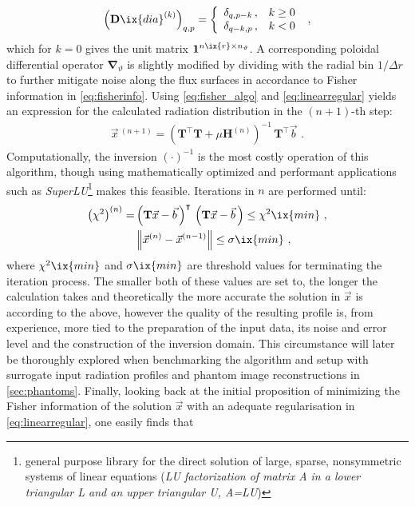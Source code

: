 %
        \begin{align}%
            \left(\mathbf{D}\ix{dia}^{\left(k\right)}\right)_{q,p}=\left\{%
            \begin{array}{ll}%
                \delta_{q,p-k}\,,&k\ge0\\%
                \delta_{q-k,p}\,,&k<0%
            \end{array}\right.\,\,,\nonumber%
        \end{align}%
%
        which for $k=0$ gives the unit matrix $\mathbf{1}^{n\ix{r}\times n_{\text{$\vartheta$}}}$. A corresponding poloidal differential operator $\pmb{\nabla}_{\vartheta}$ is slightly modified by dividing with the radial bin $1/\Delta r$ to further mitigate noise along the flux surfaces in accordance to Fisher information in \cref{eq:fisherinfo}. Using \cref{eq:fisher_algo} and \cref{eq:linearregular} yields an expression for the calculated radiation distribution in the $\left(n+1\right)$-th step:
%
        \begin{align}%
            \vec{x}\,^{\left(n+1\right)}=\left(\mathbf{T}^{\intercal}\mathbf{T}+\mu\mathbf{H}^{\left(n\right)}\right)^{-1}\,\mathbf{T}^{\intercal}\vec{b}\,\,.\label{eq:fisher_iteration}%
        \end{align}%
%
        Computationally, the inversion $\left(\cdot\right)^{-1}$ is the most costly operation of this algorithm, though using mathematically optimized and performant applications such as \textit{SuperLU}\footnote[1]{general purpose library for the direct solution of large, sparse, nonsymmetric systems of linear equations (\textit{LU factorization of matrix A in a lower triangular L and an upper triangular U, A=LU})}\cite{Li2005} makes this feasible. Iterations in $n$ are performed until:%
%
        \begin{align}
            \begin{split}%
                \left(\chi^{2}\right)^{\left(n\right)}=&\left(\mathbf{T}\vec{x}-\vec{b\,}\right)^{\intercal}\,\left(\mathbf{T}\vec{x}-\vec{b}\,\right)\le\chi^{2}\ix{min}\,\,,\\%
                &\left\|\vec{x}^{\left(n\right)}-\vec{x}^{\left(n-1\right)}\right\|\le\sigma\ix{min}\,\,,%
            \end{split}%
        \end{align}
%
        where $\chi^{2}\ix{min}$ and $\sigma\ix{min}$ are threshold values for terminating the iteration process. The smaller both of these values are set to, the longer the calculation takes and theoretically the more accurate the solution in $\vec{x}$ is according to the above, however the quality of the resulting profile is, from experience, more tied to the preparation of the input data, its noise and error level and the construction of the inversion domain. This circumstance will later be thoroughly explored when benchmarking the algorithm and setup with surrogate input radiation profiles and phantom image reconstructions in \cref{sec:phantoms}. Finally, looking back at the initial proposition of minimizing the Fisher information of the solution $\vec{x}$ with an adequate regularisation in \cref{eq:linearregular}, one easily finds that
